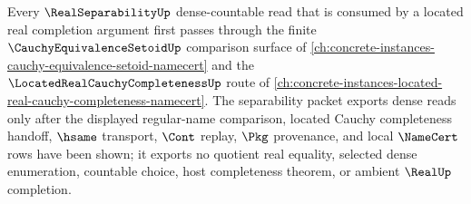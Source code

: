 Every $\RealSeparabilityUp$ dense-countable read that is consumed by a located real completion argument first passes through the finite $\CauchyEquivalenceSetoidUp$ comparison surface of \autoref{ch:concrete-instances-cauchy-equivalence-setoid-namecert} and the $\LocatedRealCauchyCompletenessUp$ route of \autoref{ch:concrete-instances-located-real-cauchy-completeness-namecert}. The separability packet exports dense reads only after the displayed regular-name comparison, located Cauchy completeness handoff, $\hsame$ transport, $\Cont$ replay, $\Pkg$ provenance, and local $\NameCert$ rows have been shown; it exports no quotient real equality, selected dense enumeration, countable choice, host completeness theorem, or ambient $\RealUp$ completion.
